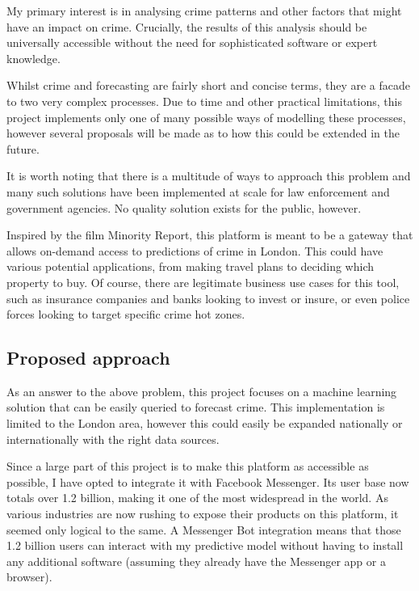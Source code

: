 \documentclass{article}
\begin{document}
	My primary interest is in analysing crime patterns and other factors that might have an impact on crime. Crucially, the results of this analysis should be universally accessible without the need for sophisticated software or expert knowledge.

	Whilst crime and forecasting are fairly short and concise terms, they are a facade to two very complex processes. Due to time and other practical limitations, this project implements only one of many possible ways of modelling these processes, however several proposals will be made as to how this could be extended in the future.

	It is worth noting that there is a multitude of ways to approach this problem and many such solutions have been implemented at scale for law enforcement and government agencies. No quality solution exists for the public, however.

	Inspired by the film Minority Report, this platform is meant to be a gateway that allows on-demand access to predictions of crime in London. This could have various potential applications, from making travel plans to deciding which property to buy. Of course, there are legitimate business use cases for this tool, such as insurance companies and banks looking to invest or insure, or even police forces looking to target specific crime hot zones.

	\subsection{Proposed approach}

	As an answer to the above problem, this project focuses on a machine learning solution that can be easily queried to forecast crime. This implementation is limited to the London area, however this could easily be expanded nationally or internationally with the right data sources.

	Since a large part of this project is to make this platform as accessible as possible, I have opted to integrate it with Facebook Messenger. Its user base now totals over 1.2 billion, making it one of the most widespread in the world. As various industries are now rushing to expose their products on this platform, it seemed only logical to the same. A Messenger Bot integration means that those 1.2 billion users can interact with my predictive model without having to install any additional software (assuming they already have the Messenger app or a browser).
\end{document}
